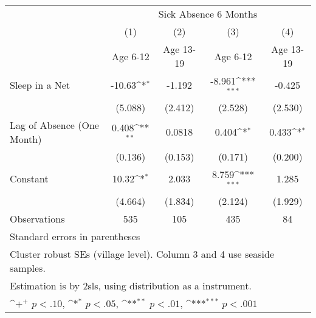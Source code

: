 {
\def\sym#1{\ifmmode^{#1}\else\(^{#1}\)\fi}
\begin{tabular}{l*{4}{c}}
\hline\hline
                    &\multicolumn{4}{c}{Sick Absence 6 Months}                                              \\
                    &\multicolumn{1}{c}{(1)}         &\multicolumn{1}{c}{(2)}         &\multicolumn{1}{c}{(3)}         &\multicolumn{1}{c}{(4)}         \\
                    &    Age 6-12         &   Age 13-19         &    Age 6-12         &   Age 13-19         \\
\hline
Sleep in a Net      &      -10.63\sym{*}  &      -1.192         &      -8.961\sym{***}&      -0.425         \\
                    &     (5.088)         &     (2.412)         &     (2.528)         &     (2.530)         \\
[1em]
Lag of Absence (One Month)&       0.408\sym{**} &      0.0818         &       0.404\sym{*}  &       0.433\sym{*}  \\
                    &     (0.136)         &     (0.153)         &     (0.171)         &     (0.200)         \\
[1em]
Constant            &       10.32\sym{*}  &       2.033         &       8.759\sym{***}&       1.285         \\
                    &     (4.664)         &     (1.834)         &     (2.124)         &     (1.929)         \\
\hline
Observations        &         535         &         105         &         435         &          84         \\
\hline\hline
\multicolumn{5}{l}{\footnotesize Standard errors in parentheses}\\
\multicolumn{5}{l}{\footnotesize Cluster robust SEs (village level). Column 3 and 4 use seaside samples.}\\
\multicolumn{5}{l}{\footnotesize Estimation is by 2sls, using distribution as a instrument.}\\
\multicolumn{5}{l}{\footnotesize \sym{+} \(p<.10\), \sym{*} \(p<.05\), \sym{**} \(p<.01\), \sym{***} \(p<.001\)}\\
\end{tabular}
}

